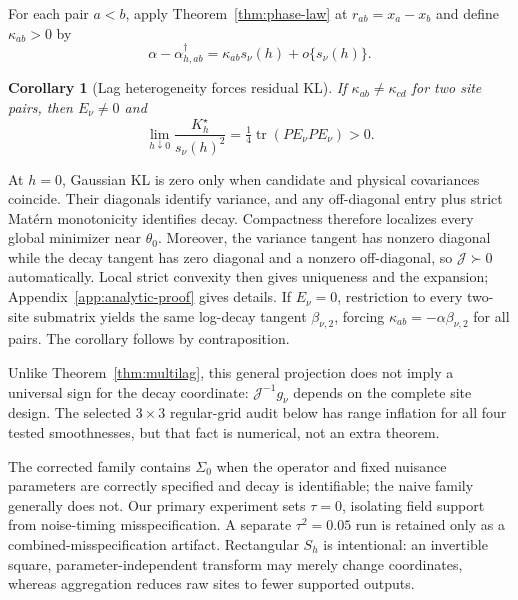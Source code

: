 \documentclass[sigconf]{acmart}
\newtheorem{corollary}{Corollary}
\theoremstyle{remark}
\newcommand{\tr}{\operatorname{tr}}
\begin{document}
For each pair \(a<b\), apply Theorem~\ref{thm:phase-law} at
\(r_{ab}=x_a-x_b\) and define \(\kappa_{ab}>0\) by
\begin{equation}
 \alpha-\alpha_{h,ab}^\dagger
 =\kappa_{ab}s_\nu(h)+o\{s_\nu(h)\}.
 \label{eq:pair-design-coefficient}
\end{equation}
\begin{corollary}[Lag heterogeneity forces residual KL]
\label{cor:lag-heterogeneity}
If \(\kappa_{ab}\ne\kappa_{cd}\) for two site pairs, then \(E_\nu\ne0\) and
\begin{equation}
 \lim_{h\downarrow0}\frac{K_h^\star}{s_\nu(h)^2}
 =\tfrac14\tr(PE_\nu PE_\nu)>0.
 \label{eq:positive-full-kl}
\end{equation}
\end{corollary}

At \(h=0\), Gaussian KL is zero only when candidate and physical covariances
coincide. Their diagonals identify variance, and any off-diagonal entry plus
strict Matérn monotonicity identifies decay. Compactness therefore localizes
every global minimizer near \(\theta_0\). Moreover, the variance tangent has
nonzero diagonal while the decay tangent has zero diagonal and a nonzero
off-diagonal, so \(\mathcal J\succ0\) automatically. Local strict convexity
then gives uniqueness and the expansion; Appendix~\ref{app:analytic-proof}
gives details. If \(E_\nu=0\), restriction to every two-site submatrix yields
the same log-decay tangent \(\beta_{\nu,2}\), forcing
\(\kappa_{ab}=-\alpha\beta_{\nu,2}\) for all pairs. The corollary follows by
contraposition.

Unlike Theorem~\ref{thm:multilag}, this general projection does not imply a
universal sign for the decay coordinate: \(\mathcal J^{-1}g_\nu\) depends on
the complete site design. The selected \(3\times3\) regular-grid audit below has range
inflation for all four tested smoothnesses, but that fact is numerical, not an
extra theorem.

The corrected family contains \(\Sigma_0\) when the operator and fixed nuisance
parameters are correctly specified and decay is identifiable; the naive family
generally does not. Our primary experiment sets \(\tau=0\), isolating field
support from noise-timing misspecification. A separate \(\tau^2=0.05\) run is
retained only as a combined-misspecification artifact. Rectangular \(S_h\) is
intentional: an invertible square,
parameter-independent transform may merely change coordinates, whereas
aggregation reduces raw sites to fewer supported outputs.
\end{document}
